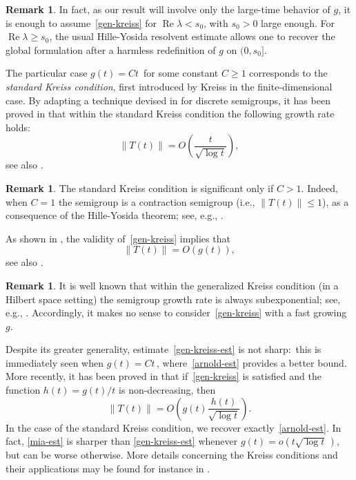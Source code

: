 \documentclass[12pt]{amsart}
\theoremstyle{plain}
\theoremstyle{definition}
\newtheorem{remark}[theorem]{Remark}
\numberwithin{equation}{section}
\DeclareMathOperator*{\re}{Re}
\begin{document}
\begin{remark}
In fact, as our result will involve only the large-time behavior of $g$,
it is enough to assume~\eqref{gen-kreiss} for $\re\lambda<s_0$, with $s_0>0$ large enough.
For $\re\lambda\geq s_0$, the usual
Hille-Yosida resolvent estimate allows one to recover the global formulation
after a harmless redefinition of $g$ on $(0,s_0]$.
\end{remark}

The particular case $g(t)= C t\,$ for some constant $C\geq 1$ corresponds to the
\emph{standard Kreiss condition},
first introduced by Kreiss \cite{kreiss-paper} in the finite-dimensional case.
By adapting a technique devised in \cite{BoMu,CCEL}
for discrete semigroups, it has been proved in \cite{ARN} that within the standard Kreiss condition
the following growth rate holds:
\begin{equation}
\label{arnold-est}
\|T (t)\|=O\left(\frac{t}{\sqrt{\log t}}\right),
\end{equation}
see also \cite{EZ,RO}.

\begin{remark}
The standard Kreiss condition is significant only if $C>1$. Indeed, when $C=1$ the semigroup is
a contraction semigroup (i.e., $\|T (t)\|\leq 1$),
as a consequence of the Hille-Yosida theorem; see, e.g., \cite[Theorem II.3.5]{ENG}.
\end{remark}

As shown in \cite{ROVE}, the validity of~\eqref{gen-kreiss} implies that
\begin{equation}
\label{gen-kreiss-est}
\|T (t)\|=O(g(t)),
\end{equation}
see also \cite{Bou,EZ2,HEL,HEL2,HEL3,RO,ROVE}.

\begin{remark}
It is well known that within the generalized Kreiss condition (in a Hilbert space setting) the semigroup growth rate is
always subexponential;
see, e.g., \cite{DE,ROVE}. Accordingly, it makes no sense
to consider~\eqref{gen-kreiss}
with a fast growing $g$.
 
\end{remark}
Despite its greater generality, estimate~\eqref{gen-kreiss-est} is not sharp:\
this is immediately seen when $g(t)= C t\,$, where~\eqref{arnold-est} provides
a better bound.
More recently, it has been proved in \cite{DE} that
if~\eqref{gen-kreiss} is satisfied and the function $h(t)=g(t)/t$ is non-decreasing, then
\begin{equation}
\label{mia-est}
\|T (t)\|= O\left(g(t)\frac{h(t)}{\sqrt{\log t}}\right).
\end{equation}
In the case of the standard Kreiss condition, we recover exactly~\eqref{arnold-est}.
In fact, \eqref{mia-est} is sharper than \eqref{gen-kreiss-est} whenever $g(t)=o(t\sqrt{\log t}\,)$,
but can be worse otherwise.
More details concerning the Kreiss conditions and their applications may be found for instance in \cite{ARN2,EZ2,ROVE,ROVE2}.
\end{document}
